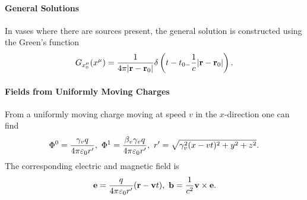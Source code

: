\paragraph{General Solutions}
In vases where there are sources present, the general solution is constructed using the Green's function
\begin{align*}
	G_{x_{0}^{\mu}}(x^{\mu}) = \frac{1}{4\pi\abs{\vb{r} - \vb{r}_{0}}}\delta\left(t - t_{0 - }\frac{1}{c}\abs{\vb{r} - \vb{r}_{0}}\right).
\end{align*}

\paragraph{Fields from Uniformly Moving Charges}
From a uniformly moving charge moving at speed $v$ in the $x$-direction one can find
\begin{align*}
	\Phi^{0} = \frac{\gamma_{v}q}{4\pi\varepsilon_{0}r^{\prime}},\ \Phi^{1} = \frac{\beta_{v}\gamma_{v}q}{4\pi\varepsilon_{0}r^{\prime}},\ r^{\prime} = \sqrt{\gamma_{v}^{2}(x - vt)^{2} + y^{2} + z^{2}}.
\end{align*}
The corresponding electric and magnetic field is
\begin{align*}
	\vb{e} = \frac{q}{4\pi\varepsilon_{0}r^{\prime}}(\vb{r} - \vb{v}t),\ \vb{b} = \frac{1}{c^{2}}\vb{v}\times\vb{e}.
\end{align*}